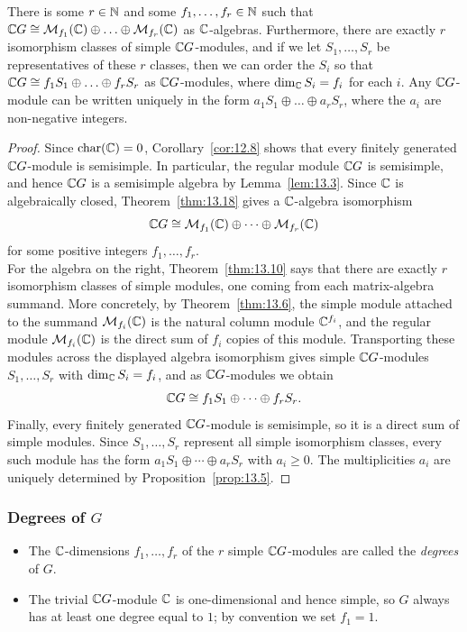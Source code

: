 \documentclass[../Odyssey_Project.tex]{subfiles}
\begin{document}
\begin{theorem}
\label{thm:14.1}
There is some $r \in \mathbb{N}$ and some $f_1, \ldots, f_r \in \mathbb{N}$ such that $\mathbb{C} G \cong \mathcal{M}_{f_1}(\mathbb{C}) \oplus \ldots \oplus \mathcal{M}_{f_r}(\mathbb{C})$ as $\mathbb{C}$-algebras. Furthermore, there are exactly $r$ isomorphism classes of simple $\mathbb{C} G$-modules, and if we let $S_1, \ldots, S_r$ be representatives of these $r$ classes, then we can order the $S_i$ so that $\mathbb{C} G \cong f_1 S_1 \oplus \ldots \oplus f_r S_r$ as $\mathbb{C} G$-modules, where $\dim_{\mathbb{C}} S_i = f_i$ for each $i$. Any $\mathbb{C} G$-module can be written uniquely in the form $a_1 S_1 \oplus \ldots \oplus a_r S_r$, where the $a_i$ are non-negative integers.
\end{theorem}
\begin{proof}
    Since $\mathrm{char}(\mathbb{C})=0$, Corollary~\ref{cor:12.8} shows that every finitely generated $\mathbb{C} G$-module is semisimple. In particular, the regular module $\mathbb{C} G$ is semisimple, and hence $\mathbb{C} G$ is a semisimple algebra by Lemma~\ref{lem:13.3}. Since $\mathbb{C}$ is algebraically closed, Theorem~\ref{thm:13.18} gives a $\mathbb{C}$-algebra isomorphism
    \[
        \mathbb{C} G \cong \mathcal{M}_{f_1}(\mathbb{C}) \oplus \cdots \oplus \mathcal{M}_{f_r}(\mathbb{C})
    \]
    for some positive integers $f_1,\ldots,f_r$.\\
    For the algebra on the right, Theorem~\ref{thm:13.10} says that there are exactly $r$ isomorphism classes of simple modules, one coming from each matrix-algebra summand. More concretely, by Theorem~\ref{thm:13.6}, the simple module attached to the summand $\mathcal{M}_{f_i}(\mathbb{C})$ is the natural column module $\mathbb{C}^{f_i}$, and the regular module $\mathcal{M}_{f_i}(\mathbb{C})$ is the direct sum of $f_i$ copies of this module. Transporting these modules across the displayed algebra isomorphism gives simple $\mathbb{C} G$-modules $S_1,\ldots,S_r$ with $\dim_{\mathbb{C}}S_i=f_i$, and as $\mathbb{C} G$-modules we obtain
    \[
        \mathbb{C} G \cong f_1S_1 \oplus \cdots \oplus f_rS_r.
    \]
    Finally, every finitely generated $\mathbb{C} G$-module is semisimple, so it is a direct sum of simple modules. Since $S_1,\ldots,S_r$ represent all simple isomorphism classes, every such module has the form $a_1S_1 \oplus \cdots \oplus a_rS_r$ with $a_i \geq 0$. The multiplicities $a_i$ are uniquely determined by Proposition~\ref{prop:13.5}.
\end{proof}

\subsubsection*{Degrees of $G$}
\begin{itemize}
    \item The $\mathbb{C}$-dimensions $f_1, \ldots, f_r$ of the $r$ simple $\mathbb{C} G$-modules are called the \emph{degrees} of $G$.
    \item The trivial $\mathbb{C} G$-module $\mathbb{C}$ is one-dimensional and hence simple, so $G$ always has at least one degree equal to $1$; by convention we set $f_1 = 1$.
\end{itemize}
\end{document}
